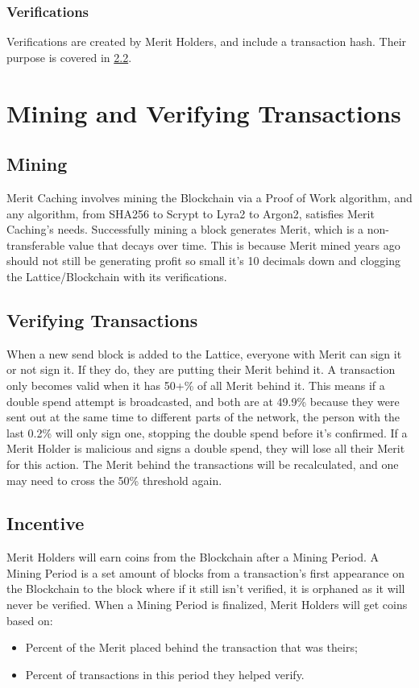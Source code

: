 \documentclass[14pt]{article}
\begin{document}
\label{sec:1.2.2}
\subsubsection{Verifications}
Verifications are created by Merit Holders, and include a transaction hash. Their purpose is covered in \hyperref[sec:2.2]{2.2}.

\newpage

\label{sec:2}
\section{Mining and Verifying Transactions}

\label{sec:2.1}
\subsection{Mining}
Merit Caching involves mining the Blockchain via a Proof of Work algorithm, and any algorithm, from SHA256 to Scrypt to Lyra2 to Argon2, satisfies Merit Caching's needs. Successfully mining a block generates Merit, which is a non-transferable value that decays over time. This is because Merit mined years ago should not still be generating profit so small it's 10 decimals down and clogging the Lattice/Blockchain with its verifications.

\label{sec:2.2}
\subsection{Verifying Transactions}
When a new send block is added to the Lattice, everyone with Merit can sign it or not sign it. If they do, they are putting their Merit behind it. A transaction only becomes valid when it has 50+\% of all Merit behind it. This means if a double spend attempt is broadcasted, and both are at 49.9\% because they were sent out at the same time to different parts of the network, the person with the last 0.2\% will only sign one, stopping the double spend before it's confirmed. If a Merit Holder is malicious and signs a double spend, they will lose all their Merit for this action. The Merit behind the transactions will be recalculated, and one may need to cross the 50\% threshold again.

\newpage

\label{sec:2.3}
\subsection{Incentive}
Merit Holders will earn coins from the Blockchain after a Mining Period. A Mining Period is a set amount of blocks from a transaction's first appearance on the Blockchain to the block where if it still isn't verified, it is orphaned as it will never be verified. When a Mining Period is finalized, Merit Holders will get coins based on:
\begin{itemize}
\item Percent of the Merit placed behind the transaction that was theirs;
\item Percent of transactions in this period they helped verify.
\end{itemize}
\end{document}
